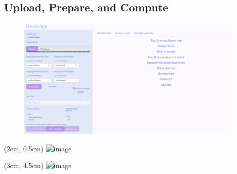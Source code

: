 \documentclass[10pt]{beamer}
\begin{document}
\subsection{Upload, Prepare, and Compute}
\begin{frame}
\begin{figure}
\includegraphics[width=\linewidth]{upload.png}
\end{figure}

\begin{textblock*}{10cm}(2cm, 0.5cm)
{\includegraphics<2->[width=0.5\linewidth]{select.png}}
\end{textblock*}

\begin{textblock*}{10cm}(3cm, 4.5cm)
{\includegraphics<3->[width=0.5\linewidth]{compute.png}}
\end{textblock*}
\end{frame}
\end{document}
